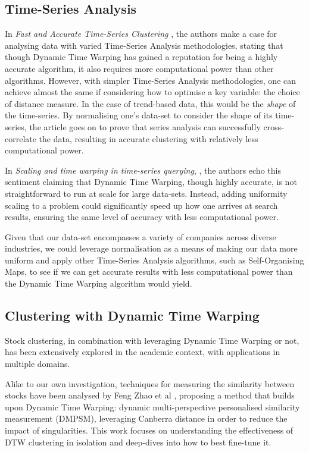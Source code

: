\documentclass[11pt]{article}
\begin{document}
\subsection{Time-Series Analysis}

In \textit{Fast and Accurate Time-Series Clustering} \cite{fastAccurateTimeSeriesClustering}, the authors make a case for analysing data with varied Time-Series Analysis methodologies, stating that though Dynamic Time Warping has gained a reputation for being a highly accurate algorithm, it also requires more computational power than other algorithms. However, with simpler Time-Series Analysis methodologies, one can achieve almost the same if considering how to optimise a key variable: the choice of distance measure. In the case of trend-based data, this would be the \textit{shape} of the time-series. By normalising one's data-set to consider the shape of its time-series, the article goes on to prove that series analysis can successfully cross-correlate the data, resulting in accurate clustering with relatively less computational power. 

In \textit{Scaling and time warping in time-series querying}, \cite{ref3}, the authors echo this sentiment claiming that Dynamic Time Warping, though highly accurate, is not straightforward to run at scale for large data-sets. Instead, adding uniformity scaling to a problem could significantly speed up how one arrives at search results, ensuring the same level of accuracy with less computational power. 

Given that our data-set encompasses a variety of companies across diverse industries, we could leverage normalisation as a means of making our data more uniform and apply other Time-Series Analysis algorithms, such as Self-Organising Maps, to see if we can get accurate results with less computational power than the Dynamic Time Warping algorithm would yield.

\subsection{Clustering with Dynamic Time Warping}

Stock clustering, in combination with leveraging Dynamic Time Warping or not, has been extensively explored in the academic context, with applications in multiple domains. 

Alike to our own investigation, techniques for measuring the similarity between stocks have been analysed by Feng Zhao et al \cite{ref4}, proposing a method that builds upon Dynamic Time Warping: dynamic multi-perspective personalised similarity measurement (DMPSM), leveraging Canberra distance in order to reduce the impact of singularities. This work focuses on understanding the effectiveness of DTW clustering in isolation and deep-dives into how to best fine-tune it.
\end{document}
